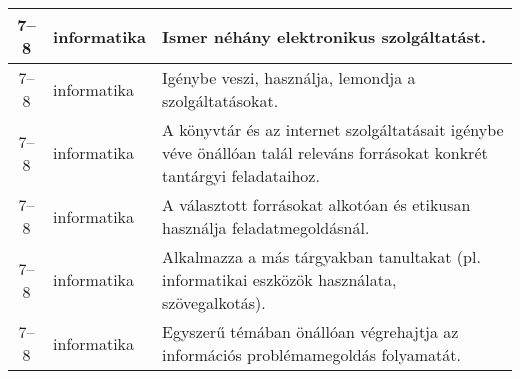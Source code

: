 \begin{small}
\begin{longtable}{c | p{2cm} |  p{11cm} }
              7--8 & informatika & Ismer néhány elektronikus szolgáltatást. \\ \hline
              7--8 & informatika & Igénybe veszi, használja, lemondja a szolgáltatásokat. \\ \hline
              7--8 & informatika & A könyvtár és az internet szolgáltatásait igénybe véve önállóan talál releváns forrásokat konkrét tantárgyi feladataihoz. \\ \hline
              7--8 & informatika & A választott forrásokat alkotóan és etikusan használja feladatmegoldásnál. \\ \hline
              7--8 & informatika & Alkalmazza a más tárgyakban tanultakat (pl. informatikai eszközök használata, szövegalkotás). \\ \hline
              7--8 & informatika & Egyszerű témában önállóan végrehajtja az információs problémamegoldás folyamatát. \\ \hline
      \end{longtable}
\end{small}


